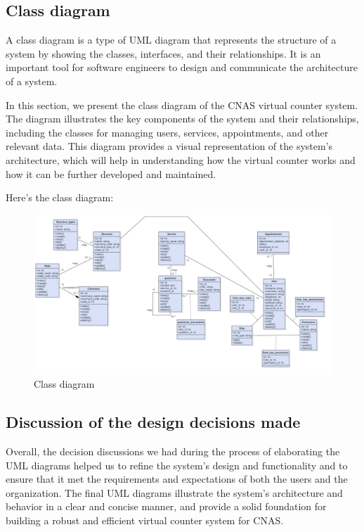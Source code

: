 \subsection{Class diagram}
A class diagram is a type of UML diagram that represents the structure of a system by showing the classes, interfaces, and their relationships. It is an important tool for software engineers to design and communicate the architecture of a system. 

\medskip In this section, we present the class diagram of the CNAS virtual counter system. The diagram illustrates the key components of the system and their relationships, including the classes for managing users, services, appointments, and other relevant data. This diagram provides a visual representation of the system's architecture, which will help in understanding how the virtual counter works and how it can be further developed and maintained.

\bigskip Here's the class diagram:
\begin{figure}[H]
    \centering
    \includegraphics[width=1.0\textwidth]{ClassDiagram.png}
    \caption{Class diagram}
    \label{classdiagram}
\end{figure}
\newpage

\subsection{Discussion of the design decisions made}
Overall, the decision discussions we had during the process of elaborating the UML diagrams helped us to refine the system's design and functionality and to ensure that it met the requirements and expectations of both the users and the organization. The final UML diagrams illustrate the system's architecture and behavior in a clear and concise manner, and provide a solid foundation for building a robust and efficient virtual counter system for CNAS.

